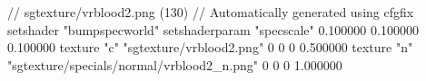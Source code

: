 // sgtexture/vrblood2.png (130)
// Automatically generated using cfgfix
setshader "bumpspecworld"
setshaderparam "specscale" 0.100000 0.100000 0.100000
texture "c" "sgtexture/vrblood2.png" 0 0 0 0.500000
texture "n" "sgtexture/specials/normal/vrblood2_n.png" 0 0 0 1.000000

